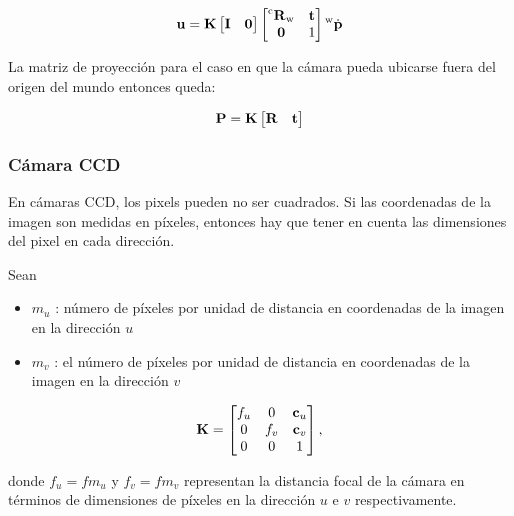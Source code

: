 \begin{frame}
   	\begin{equation*}
        \boldsymbol{\mathbf{u}}=\boldsymbol{\mathbf{K}}\begin{bmatrix} \boldsymbol{\mathbf{I}} & \boldsymbol{\mathbf{0}}\end{bmatrix} \begin{bmatrix}
            \prescript{\mathrm{\mathrm{c}}}{}{{\boldsymbol{\mathbf{R}}}_\mathrm{\mathrm{w}}} & \boldsymbol{\mathbf{t}} \\
            \boldsymbol{\mathbf{0}} & 1
        \end{bmatrix}
        \prescript{\mathrm{\mathrm{w}}}{}{\dot{\boldsymbol{\mathbf{p}}}}
    \end{equation*}
    
    La matriz de proyección para el caso en que la cámara pueda ubicarse fuera del origen del mundo entonces queda:
    
   	\begin{equation*}
       \boldsymbol{\mathbf{P}}=\boldsymbol{\mathbf{K}}\begin{bmatrix}\boldsymbol{\mathbf{R}} & \boldsymbol{\mathbf{t}}\end{bmatrix}
    \end{equation*}
\end{frame}

\begin{frame}
    \frametitle{Cámara CCD}
    \footnotesize
    
    En cámaras CCD, los pixels pueden no ser cuadrados. Si las coordenadas de la imagen son medidas en píxeles, entonces hay que tener en cuenta las dimensiones del pixel en cada dirección.
    
    Sean
    \begin{itemize}
        \item $m_{u}$ : número de píxeles por unidad de distancia en coordenadas de la
        imagen en la dirección $u$
        \item $m_{v}$ : el número de píxeles por unidad de distancia en coordenadas de
        la imagen en la dirección $v$
    \end{itemize}

    \begin{equation*}
        \boldsymbol{\mathbf{K}}=
        \begin{bmatrix}f_{u} & 0 & \boldsymbol{\mathbf{c}}_{u}\\
            0 & f_{v} & \boldsymbol{\mathbf{c}}_{v}\\
            0 & 0 & 1
        \end{bmatrix},
    \end{equation*}

    donde $f_{u} = f m_{u} $ y $f_{v} = f m_{v}$ representan la distancia focal de la cámara en términos de dimensiones de píxeles en la dirección $u$ e $v$ respectivamente.
\end{frame}

